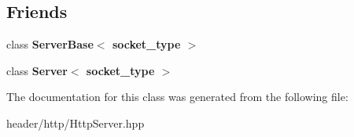 \subsection*{Friends}
\begin{DoxyCompactItemize}
\item 
\mbox{\label{classhttp_1_1_server_base_1_1_request_a01d54a7e16ca437c98ec571deca98dfc}} 
class {\bfseries Server\+Base$<$ socket\+\_\+type $>$}
\item 
\mbox{\label{classhttp_1_1_server_base_1_1_request_a3f155064c0074d68a408aa3193ca1666}} 
class {\bfseries Server$<$ socket\+\_\+type $>$}
\end{DoxyCompactItemize}


The documentation for this class was generated from the following file\+:\begin{DoxyCompactItemize}
\item 
header/http/Http\+Server.\+hpp\end{DoxyCompactItemize}
